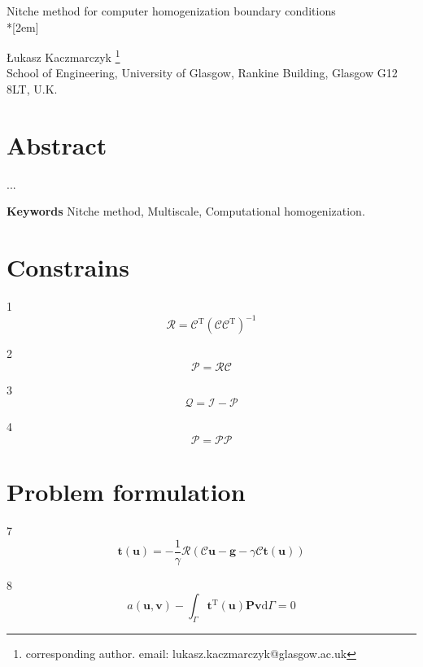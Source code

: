 \documentclass[a4paper,12pt]{article}
\begin{document}
\begin{center}

{\Large  Nitche method for computer homogenization boundary conditions}\\*[2em]

{\L}ukasz Kaczmarczyk \footnote{corresponding
author. email: lukasz.kaczmarczyk@glasgow.ac.uk} \\
School of Engineering, University of
Glasgow, Rankine Building, Glasgow G12 8LT, U.K.
\end{center}

\section*{Abstract}

...

{\bf Keywords} Nitche method, Multiscale, Computational homogenization.

\section{Constrains}

1
\begin{equation}
\mathcal{R} = \mathcal{C}^\textrm{T}(\mathcal{C}\mathcal{C}^\textrm{T})^{-1}
\end{equation}

2
\begin{equation}
\mathcal{P} = \mathcal{R}\mathcal{C}
\end{equation}

3
\begin{equation}
\mathcal{Q} = \mathcal{I}-\mathcal{P}
\end{equation}

4
\begin{equation}
\mathcal{P} = \mathcal{P}\mathcal{P}
\end{equation}

\section{Problem formulation}

7
\begin{equation}
\mathbf{t}(\mathbf{u}) =
-\frac{1}{\gamma}
\mathcal{R}(\mathcal{C}\mathbf{u}-\mathbf{g}-\gamma\mathcal{C}\mathbf{t}(\mathbf{u}))
\end{equation}

8
\begin{equation}
a(\mathbf{u},\mathbf{v})
-
\int_\Gamma \mathbf{t}^\textrm{T}(\mathbf{u})\mathbf{P}\mathbf{v} \textrm{d}\Gamma = 0
\end{equation}
\end{document}
